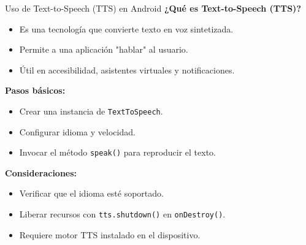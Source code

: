 \begin{frame}[fragile]{Uso de Text-to-Speech (TTS) en Android}
\textbf{¿Qué es Text-to-Speech (TTS)?}

\begin{itemize}
    \item Es una tecnología que convierte texto en voz sintetizada.
    \item Permite a una aplicación "hablar" al usuario.
    \item Útil en accesibilidad, asistentes virtuales y notificaciones.
\end{itemize}


\textbf{Pasos básicos:}
\begin{itemize}
    \item Crear una instancia de \texttt{TextToSpeech}.
    \item Configurar idioma y velocidad.
    \item Invocar el método \texttt{speak()} para reproducir el texto.
\end{itemize}


\textbf{Consideraciones:}
\begin{itemize}
    \item Verificar que el idioma esté soportado.
    \item Liberar recursos con \texttt{tts.shutdown()} en \texttt{onDestroy()}.
    \item Requiere motor TTS instalado en el dispositivo.
\end{itemize}

\end{frame}



